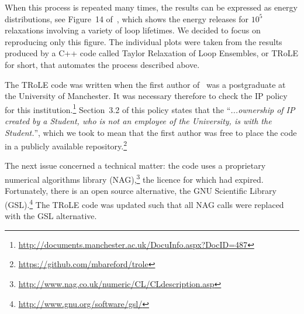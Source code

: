 When this process is repeated many times, the results can be expressed as energy distributions, see Figure~14 of~\cite{bareford2010nanoflare}, which shows the energy releases for $10^5$ relaxations involving a variety of loop lifetimes. We decided to focus on reproducing only this figure. The individual plots were taken from the results produced by a C++ code called Taylor Relaxation of Loop Ensembles, or TRoLE for short, that automates the process described above.

The TRoLE code was written when the first author of~\cite{bareford2010nanoflare}
was a postgraduate at the University of Manchester. It was necessary therefore
to check the IP policy for this
institution.\footnote{\url{http://documents.manchester.ac.uk/DocuInfo.aspx?DocID=487}}
Section~3.2 of this policy states that the ``\emph{...ownership of IP created by
a Student, who is not an employee of the University, is with the Student.}'',
which we took to mean that the first author was free to place the code in a
publicly available
repository.\footnote{\url{https://github.com/mbareford/trole}}

The next issue concerned a technical matter: the code uses
a proprietary numerical algorithms library
(NAG),\footnote{\url{http://www.nag.co.uk/numeric/CL/CLdescription.asp}} the
licence for which had expired. Fortunately, there is an open source alternative,
the GNU Scientific Library
(GSL).\footnote{\url{http://www.gnu.org/software/gsl/}} The TRoLE code was updated such that all NAG calls were replaced with the GSL alternative. 

% 

